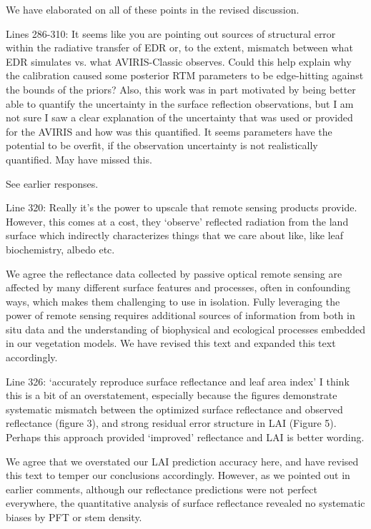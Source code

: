 We have elaborated on all of these points in the revised discussion.

\begin{reviewer}
  Lines 286-310: It seems like you are pointing out sources of structural error within the radiative transfer of EDR or, to the extent, mismatch between what EDR simulates vs. what AVIRIS-Classic observes. Could this help explain why the calibration caused some posterior RTM parameters to be edge-hitting against the bounds of the priors? Also, this work was in part motivated by being better able to quantify the uncertainty in the surface reflection observations, but I am not sure I saw a clear explanation of the uncertainty that was used or provided for the AVIRIS and how was this quantified. It seems parameters have the potential to be overfit, if the observation uncertainty is not realistically quantified. May have missed this.
\end{reviewer}

See earlier responses.

\begin{reviewer}
  Line 320: Really it’s the power to upscale that remote sensing products provide. However, this comes at a cost, they ‘observe’ reflected radiation from the land surface which indirectly characterizes things that we care about like, like leaf biochemistry, albedo etc.
\end{reviewer}

We agree the reflectance data collected by passive optical remote sensing are affected by many different surface features and processes, often in confounding ways, which makes them challenging to use in isolation. Fully leveraging the power of remote sensing requires additional sources of information from both in situ data and the understanding of biophysical and ecological processes embedded in our vegetation models. We have revised this text and expanded this text accordingly.

\begin{reviewer}
  Line 326: ‘accurately reproduce surface reflectance and leaf area index’ I think this is a bit of an overstatement, especially because the figures demonstrate systematic mismatch between the optimized surface reflectance and observed reflectance (figure 3), and strong residual error structure in LAI (Figure 5). Perhaps this approach provided ‘improved’ reflectance and LAI is better wording.
\end{reviewer}

We agree that we overstated our LAI prediction accuracy here, and have revised this text to temper our conclusions accordingly. However, as we pointed out in earlier comments, although our reflectance predictions were not perfect everywhere, the quantitative analysis of surface reflectance revealed no systematic biases by PFT or stem density.


